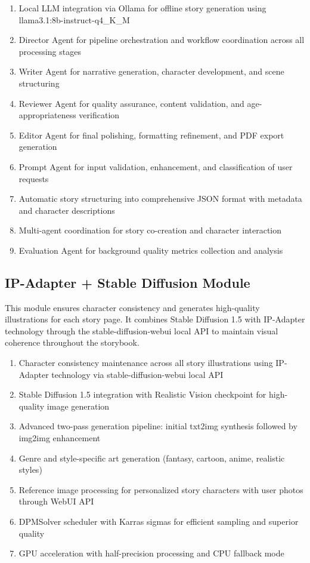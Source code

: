 \begin{enumerate}
    \item Local LLM integration via Ollama for offline story generation using llama3.1:8b-instruct-q4\_K\_M
    \item Director Agent for pipeline orchestration and workflow coordination across all processing stages
    \item Writer Agent for narrative generation, character development, and scene structuring
    \item Reviewer Agent for quality assurance, content validation, and age-appropriateness verification
    \item Editor Agent for final polishing, formatting refinement, and PDF export generation
    \item Prompt Agent for input validation, enhancement, and classification of user requests
    \item Automatic story structuring into comprehensive JSON format with metadata and character descriptions
    \item Multi-agent coordination for story co-creation and character interaction
    \item Evaluation Agent for background quality metrics collection and analysis
\end{enumerate}

\subsection{IP-Adapter + Stable Diffusion Module}

This module ensures character consistency and generates high-quality illustrations for each story page. It combines Stable Diffusion 1.5 with IP-Adapter technology through the stable-diffusion-webui local API to maintain visual coherence throughout the storybook.

\begin{enumerate}
    \item Character consistency maintenance across all story illustrations using IP-Adapter technology via stable-diffusion-webui local API
    \item Stable Diffusion 1.5 integration with Realistic Vision checkpoint for high-quality image generation
    \item Advanced two-pass generation pipeline: initial txt2img synthesis followed by img2img enhancement
    \item Genre and style-specific art generation (fantasy, cartoon, anime, realistic styles)
    \item Reference image processing for personalized story characters with user photos through WebUI API
    \item DPMSolver scheduler with Karras sigmas for efficient sampling and superior quality
    \item GPU acceleration with half-precision processing and CPU fallback mode
\end{enumerate}

